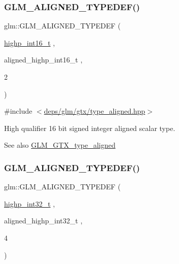 \subsubsection{\texorpdfstring{G\+L\+M\+\_\+\+A\+L\+I\+G\+N\+E\+D\+\_\+\+T\+Y\+P\+E\+D\+E\+F()}{GLM\_ALIGNED\_TYPEDEF()}\hspace{0.1cm}{\footnotesize\ttfamily [30/209]}}
{\footnotesize\ttfamily glm\+::\+G\+L\+M\+\_\+\+A\+L\+I\+G\+N\+E\+D\+\_\+\+T\+Y\+P\+E\+D\+EF (\begin{DoxyParamCaption}\item[{\hyperlink{group__gtc__type__precision_ga07d318d61472e75238e53b9642227672}{highp\+\_\+int16\+\_\+t}}]{,  }\item[{aligned\+\_\+highp\+\_\+int16\+\_\+t}]{,  }\item[{2}]{ }\end{DoxyParamCaption})}



{\ttfamily \#include $<$\hyperlink{gtx_2type__aligned_8hpp}{deps/glm/gtx/type\+\_\+aligned.\+hpp}$>$}

High qualifier 16 bit signed integer aligned scalar type. \begin{DoxySeeAlso}{See also}
\hyperlink{group__gtx__type__aligned}{G\+L\+M\+\_\+\+G\+T\+X\+\_\+type\+\_\+aligned} 
\end{DoxySeeAlso}
\mbox{\label{group__gtx__type__aligned_gaae773c28e6390c6aa76f5b678b7098a3}} 
\subsubsection{\texorpdfstring{G\+L\+M\+\_\+\+A\+L\+I\+G\+N\+E\+D\+\_\+\+T\+Y\+P\+E\+D\+E\+F()}{GLM\_ALIGNED\_TYPEDEF()}\hspace{0.1cm}{\footnotesize\ttfamily [31/209]}}
{\footnotesize\ttfamily glm\+::\+G\+L\+M\+\_\+\+A\+L\+I\+G\+N\+E\+D\+\_\+\+T\+Y\+P\+E\+D\+EF (\begin{DoxyParamCaption}\item[{\hyperlink{group__gtc__type__precision_ga783d077a513c1f475f6cdb406b4238c3}{highp\+\_\+int32\+\_\+t}}]{,  }\item[{aligned\+\_\+highp\+\_\+int32\+\_\+t}]{,  }\item[{4}]{ }\end{DoxyParamCaption})}




